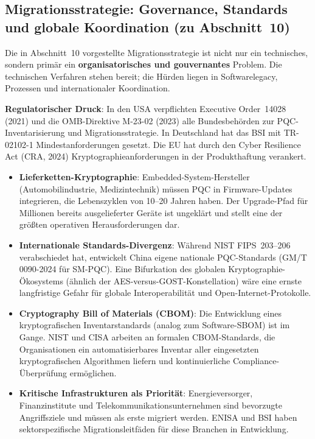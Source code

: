 ﻿\documentclass[a4paper,12pt]{article}
\theoremstyle{definition}
\begin{document}
\subsection{Migrationsstrategie: Governance, Standards und globale Koordination (zu Abschnitt~10)}

Die in Abschnitt~10 vorgestellte Migrationsstrategie ist nicht nur
ein technisches, sondern primär ein \textbf{organisatorisches und
gouvernantes} Problem. Die technischen Verfahren stehen bereit;
die Hürden liegen in Softwarelegacy, Prozessen und internationaler
Koordination.

\textbf{Regulatorischer Druck}: In den USA verpflichten
Executive Order~14028 (2021) und die OMB-Direktive M-23-02 (2023)
alle Bundesbehörden zur PQC-Inventarisierung und Migrationsstrategie.
In Deutschland hat das BSI mit TR-02102-1 \cite{BSI24}
Mindestanforderungen gesetzt. Die EU hat durch den
Cyber Resilience Act (CRA, 2024) Kryptographieanforderungen
in der Produkthaftung verankert.

\begin{itemize}
  \item \textbf{Lieferketten-Kryptographie}:
    Embedded-System-Hersteller (Automobilindustrie, Medizintechnik)
    müssen PQC in Firmware-Updates integrieren, die Lebenszyklen
    von 10--20 Jahren haben. Der Upgrade-Pfad für Millionen bereits
    ausgelieferter Geräte ist ungeklärt und stellt eine der
    größten operativen Herausforderungen dar.
  \item \textbf{Internationale Standards-Divergenz}:
    Während NIST FIPS~203--206 verabschiedet hat, entwickelt China
    eigene nationale PQC-Standards (GM/T 0090-2024 für SM-PQC).
    Eine Bifurkation des globalen Kryptographie-Ökosystems
    (ähnlich der AES-versus-GOST-Konstellation) wäre eine
    ernste langfristige Gefahr für globale Interoperabilität
    und Open-Internet-Protokolle.
  \item \textbf{Cryptography Bill of Materials (CBOM)}:
    Die Entwicklung eines kryptografischen Inventarstandards
    (analog zum Software-SBOM) ist im Gange. NIST und CISA
    arbeiten an formalen CBOM-Standards, die Organisationen
    ein automatisierbares Inventar aller eingesetzten
    kryptografischen Algorithmen liefern und kontinuierliche
    Compliance-Überprüfung ermöglichen.
  \item \textbf{Kritische Infrastrukturen als Priorität}:
    Energieversorger, Finanzinstitute und
    Telekommunikationsunternehmen sind bevorzugte Angriffsziele
    und müssen als erste migriert werden.
    ENISA und BSI haben sektorspezifische Migrationsleitfäden
    für diese Branchen in Entwicklung.
\end{itemize}
\end{document}

